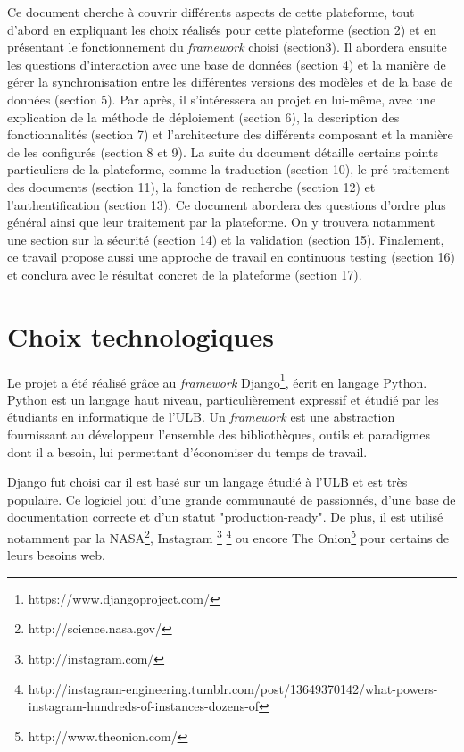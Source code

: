 \documentclass[a4paper,12pt]{article}
\begin{document}
Ce document cherche à couvrir différents aspects de cette plateforme, tout d'abord en
expliquant les choix réalisés pour cette plateforme (section 2) et en présentant
le fonctionnement du \textit{framework} choisi (section3). Il abordera ensuite
les questions d'interaction avec une base de données (section 4) et la manière
de gérer la synchronisation entre les différentes versions des modèles et de
la base de données (section 5). Par après, il s'intéressera au projet en lui-même,
avec une explication de la méthode de déploiement (section 6), la
description des fonctionnalités (section 7) et l'architecture des différents
composant et la manière de les configurés (section 8 et 9). La suite du
document détaille certains points particuliers de la plateforme, comme la traduction (section 10),
le pré-traitement des documents (section 11), la fonction de recherche (section 12)
et l'authentification (section 13). Ce document abordera des questions d'ordre 
plus général ainsi que leur traitement par la plateforme. On y trouvera notamment une section sur la
sécurité (section 14) et la validation (section 15). Finalement, ce travail propose aussi
une approche de travail en continuous testing (section 16) et conclura
avec le résultat concret de la plateforme (section 17).


\section{Choix technologiques}

Le projet a été réalisé grâce au \textit{framework} Django\footnote{https://www.djangoproject.com/}, écrit en langage Python.
Python est un langage haut niveau, particulièrement expressif et étudié par
les étudiants en informatique de l'ULB. Un \textit{framework} est une abstraction
fournissant au développeur l'ensemble des bibliothèques, outils et paradigmes
dont il a besoin, lui permettant d'économiser du temps de travail. 

Django fut choisi car il est basé sur un langage étudié à l'ULB et est très populaire.
Ce logiciel joui d'une grande communauté de passionnés, d'une base de documentation
correcte et d'un statut "production-ready". De plus, il est utilisé notamment
par la NASA\footnote{http://science.nasa.gov/}, Instagram
\footnote{http://instagram.com/}
\footnote{http://instagram-engineering.tumblr.com/post/13649370142/what-powers-instagram-hundreds-of-instances-dozens-of}
ou encore The Onion\footnote{http://www.theonion.com/} pour certains de leurs besoins web.
\end{document}
